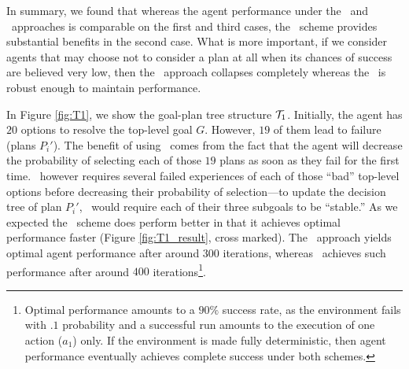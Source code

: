 % 
% 





In summary, we found that whereas the agent performance under the \BUL\ and \CL\
approaches is comparable on the first and third cases, the \BUL\ scheme provides
substantial benefits in the second case. What is more important, if we consider
agents that may choose not to consider a plan at all when its chances of success
are believed very low, then the \CL\ approach collapses completely whereas the
\BUL\ is robust enough to maintain performance.




In Figure \ref{fig:T1}, we show the goal-plan tree structure ${\mathcal{T}}_1$. Initially,
the agent has $20$ options to resolve the top-level goal $G$. However, $19$ of
them lead to failure (plans $P_i'$). The benefit of using \CL\ comes from the
fact that the agent will decrease the probability of selecting each of those $19$
plans as soon as they fail for the first time. \BUL\  however requires several
failed experiences of each of those ``bad'' top-level options before decreasing
their probability of selection---to update the decision tree of plan $P_i'$,
\BUL\ would require each of their three subgoals to be ``stable.''
As we expected the \CL\ scheme does perform better in that it achieves optimal
performance faster (Figure \ref{fig:T1_result}, cross marked). The \CL\ approach
yields optimal agent performance after around $300$ iterations, whereas \BUL\
achieves such performance after around $400$ iterations\footnote{Optimal
performance amounts to a $90\%$ success rate, as the environment fails with $.1$
probability and a successful run amounts to the execution of one action ($a_1$)
only. If the environment is made fully deterministic, then agent performance
eventually achieves complete success under both schemes.}.

